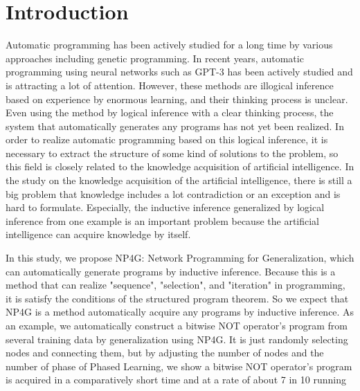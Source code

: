 \documentclass{article}
\begin{document}
\section{Introduction}
Automatic programming has been actively studied for a long time by various approaches including genetic programming.
In recent years, automatic programming using neural networks such as GPT-3\cite{gpt3} has been actively studied and is attracting a lot of attention.
However, these methods are illogical inference based on experience by enormous learning, and their thinking process is unclear.
Even using the method by logical inference with a clear thinking process, the system that automatically generates any programs has not yet been realized.
In order to realize automatic programming based on this logical inference, it is necessary to extract the structure of some kind of solutions to the problem, so this field is closely related to the knowledge acquisition of artificial intelligence.
In the study on the knowledge acquisition of the artificial intelligence, there is still a big problem that knowledge includes a lot contradiction or an exception and is hard to formulate.
Especially, the inductive inference generalized by logical inference from one example is an important problem because the artificial intelligence can acquire knowledge by itself.

In this study, we propose NP4G: Network Programming for Generalization, which can automatically generate programs by inductive inference.
Because this is a method that can realize "sequence", "selection", and "iteration" in programming, it is satisfy the conditions of the structured program theorem. So we expect that NP4G is a method automatically acquire any programs by inductive inference.
As an example, we automatically construct a bitwise NOT operator's program from several training data by generalization using NP4G.
It is just randomly selecting nodes and connecting them, but by adjusting the number of nodes and the number of phase of Phased Learning, we show a bitwise NOT operator's program is acquired in a comparatively short time and at a rate of about 7 in 10 running
\end{document}
